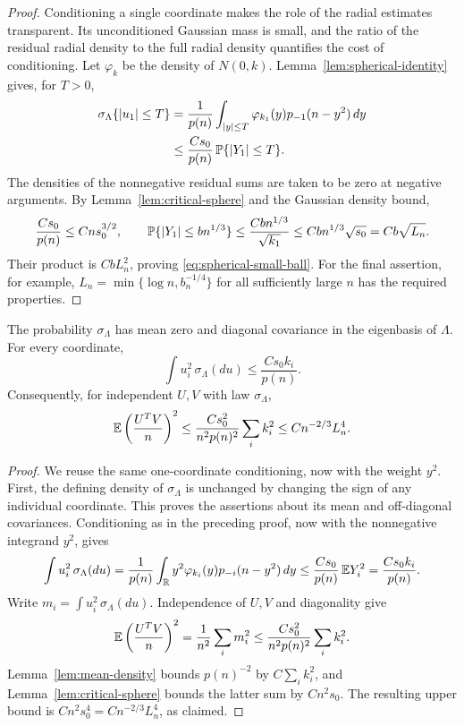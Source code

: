 \begin{proof}
Conditioning a single coordinate makes the role of the radial
estimates transparent. Its unconditioned Gaussian mass is small, and
the ratio of the residual radial density to the full radial density
quantifies the cost of conditioning. Let $\varphi_k$ be the density of
$N(0,k)$. Lemma~\ref{lem:spherical-identity} gives,
for $T>0$,
\[
 \begin{split}
 \sigma_\Lambda\{|u_1|\le T\}
 &=\frac1{p(n)}
   \int_{|y|\le T}\varphi_{k_1}(y)p_{-1}(n-y^2)\,dy\\
 &\le \frac{Cs_0}{p(n)}\,\mathbb P\{|Y_1|\le T\}.
 \end{split}
\]
The densities of the nonnegative residual sums are taken to be zero
at negative arguments.  By Lemma~\ref{lem:critical-sphere} and the
Gaussian density bound,
\[
 \frac{Cs_0}{p(n)}\le Cn s_0^{3/2},
 \qquad
 \mathbb P\{|Y_1|\le b n^{1/3}\}
 \le \frac{Cb n^{1/3}}{\sqrt{k_1}}
 \le Cb n^{1/3}\sqrt{s_0}
 =Cb\sqrt{L_n}.
\]
Their product is $CbL_n^2$, proving
\eqref{eq:spherical-small-ball}.  For the final assertion, for example,
$L_n=\min\{\log n,b_n^{-1/4}\}$ for all sufficiently large $n$ has
the required properties.
\end{proof}

\begin{lemma}
\label{lem:spherical-covariance}
The probability $\sigma_\Lambda$ has mean zero and diagonal
covariance in the eigenbasis of $\Lambda$.  For every coordinate,
\begin{equation}
\label{eq:spherical-coordinate-moment}
 \int u_i^2\,\sigma_\Lambda(du)
 \le \frac{Cs_0 k_i}{p(n)}.
\end{equation}
Consequently, for independent $U,V$ with law $\sigma_\Lambda$,
\begin{equation}
\label{eq:spherical-overlap}
 \mathbb E\left(\frac{U^TV}{n}\right)^2
 \le
 \frac{Cs_0^2}{n^2p(n)^2}\sum_i k_i^2
 \le Cn^{-2/3}L_n^4.
\end{equation}
\end{lemma}

\begin{proof}
We reuse the same one-coordinate conditioning, now with the weight
$y^2$. First, the defining density of $\sigma_\Lambda$ is unchanged by
changing the sign of any individual coordinate.  This proves the assertions
about its mean and off-diagonal covariances.
Conditioning as in the preceding proof, now with the nonnegative
integrand $y^2$, gives
\[
 \int u_i^2\,\sigma_\Lambda(du)
 =\frac1{p(n)}
   \int_{\mathbb R}y^2\varphi_{k_i}(y)p_{-i}(n-y^2)\,dy
 \le\frac{Cs_0}{p(n)}\,\mathbb E Y_i^2
 =\frac{Cs_0 k_i}{p(n)}.
\]
Write $m_i=\int u_i^2\,\sigma_\Lambda(du)$.
Independence of $U,V$ and diagonality give
\[
 \mathbb E\left(\frac{U^TV}{n}\right)^2
 =\frac1{n^2}\sum_i m_i^2
 \le\frac{Cs_0^2}{n^2p(n)^2}\sum_i k_i^2.
\]
Lemma~\ref{lem:mean-density} bounds $p(n)^{-2}$ by
$C\sum_i k_i^2$, and Lemma~\ref{lem:critical-sphere} bounds the latter
sum by $Cn^2s_0$.  The resulting upper bound is
$Cn^2s_0^4=Cn^{-2/3}L_n^4$, as claimed.
\end{proof}
